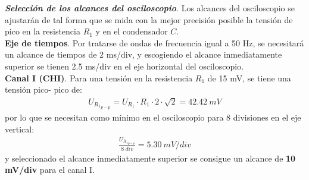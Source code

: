 \documentclass[a4paper,titlepage]{article}
\begin{document}
\textbf{\textit{Selección de los alcances del osciloscopio}}. Los alcances del osciloscopio se ajustarán de tal forma que se mida con la mejor precisión posible la tensión de pico en la resistencia $R_1$ y en el condensador $C$.\\ 

\textbf{Eje de tiempos}. Por tratarse de ondas de frecuencia igual a 50 Hz, se necesitará un alcance de tiempos de 2 ms/div, y escogiendo el alcance inmediatamente superior se tienen 2.5 ms/div en el eje horizontal del osciloscopio.\\

\textbf{Canal I (CHI)}. Para una tensión en la resistencia $R_1$ de 15 mV, se tiene una tensión pico- pico de:
\begin{gather*}
    U_{{R_{1}}_{p-p}}= U_{R_1}\cdot R_1\cdot2\cdot\sqrt{2}= 42.42\:mV
\end{gather*}
por lo que se necesitan como mínimo en el osciloscopio para 8 divisiones en el eje vertical:
\begin{gather*}
    \frac{U_{{R_{1}}_{p-p}}}{8\:div}=5.30\:mV/div
\end{gather*}
y seleccionado el alcance inmediatamente superior se consigue un alcance de \textbf{10 mV/div} para el canal I.\\
\end{document}
